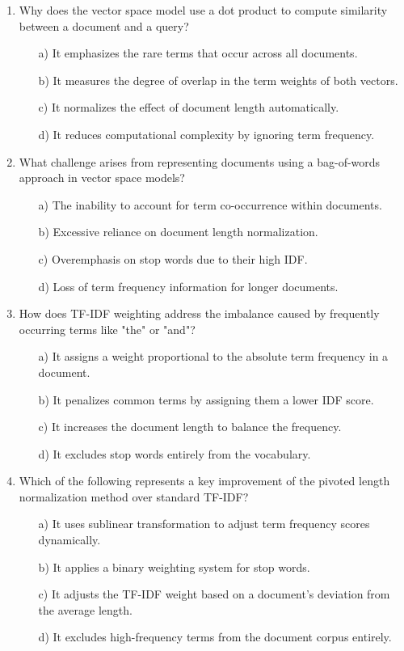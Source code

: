 \documentclass[8pt]{extarticle}
\begin{document}
\begin{multicols}{2}
\begin{enumerate}
\item Why does the vector space model use a dot product to compute similarity between a document and a query?
\begin{itemize}
    \item[a)] It emphasizes the rare terms that occur across all documents.
    \item[b)] It measures the degree of overlap in the term weights of both vectors.
    \item[c)] It normalizes the effect of document length automatically.
    \item[d)] It reduces computational complexity by ignoring term frequency.
\end{itemize}

\item What challenge arises from representing documents using a bag-of-words approach in vector space models?
\begin{itemize}
    \item[a)] The inability to account for term co-occurrence within documents.
    \item[b)] Excessive reliance on document length normalization.
    \item[c)] Overemphasis on stop words due to their high IDF.
    \item[d)] Loss of term frequency information for longer documents.
\end{itemize}

\item How does TF-IDF weighting address the imbalance caused by frequently occurring terms like "the" or "and"?
\begin{itemize}
    \item[a)] It assigns a weight proportional to the absolute term frequency in a document.
    \item[b)] It penalizes common terms by assigning them a lower IDF score.
    \item[c)] It increases the document length to balance the frequency.
    \item[d)] It excludes stop words entirely from the vocabulary.
\end{itemize}

\item Which of the following represents a key improvement of the pivoted length normalization method over standard TF-IDF?
\begin{itemize}
    \item[a)] It uses sublinear transformation to adjust term frequency scores dynamically.
    \item[b)] It applies a binary weighting system for stop words.
    \item[c)] It adjusts the TF-IDF weight based on a document’s deviation from the average length.
    \item[d)] It excludes high-frequency terms from the document corpus entirely.
\end{itemize}


\end{enumerate}
\end{multicols}
\end{document}
